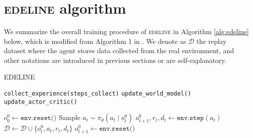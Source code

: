 \section{\textsc{edeline} algorithm}
\label{app:algorithm}
We summarize the overall training procedure of \textsc{edeline} in Algorithm \ref{alg:edeline} below, which is modified from Algorithm 1 in \citet{alonso2024diamond}. We denote as $\mathcal{D}$ the replay dataset where the agent stores data collected from the real environment, and other notations are introduced in previous sections or are self-explanatory.
\vspace{-1em}
{
\begin{algorithm}[htbp]
\caption{EDELINE}
\label{alg:edeline}
\begin{algorithmic}[1]


    \STATE \texttt{collect\_experience(steps\_collect)}
      \STATE \texttt{update\_world\_model()}
    \ENDFOR
      \STATE \texttt{update\_actor\_critic()}
    \ENDFOR
  \ENDFOR
\ENDFUNCTION

  \STATE $o_0^0 \gets \texttt{env.reset()}$
    \STATE Sample $a_t \sim \pi_\theta(a_t \mid o_t^0)$
    \STATE $o_{t+1}^0, r_t, d_t \gets \texttt{env.step}(a_t)$
    \STATE $\mathcal{D} \gets \mathcal{D} \cup \{o_t^0, a_t, r_t, d_t\}$
      \STATE $o_{t+1}^0 \gets \texttt{env.reset()}$
    \ENDIF
  \ENDFOR
\ENDFUNCTION



\end{algorithmic}
\end{algorithm}}
